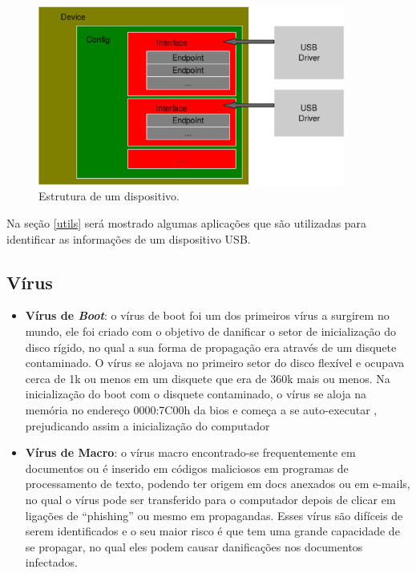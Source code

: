 \begin{figure}[H]
  \centering
  \caption{Estrutura de um dispositivo.}
  \label{fig:usbdevice}
  \includegraphics[width=0.9\textwidth]{figure/usbdevice.eps}
\end{figure}

Na seção \ref{utils} será mostrado algumas aplicações que são utilizadas para identificar
as informações de um dispositivo USB.

\subsection{Vírus}

\begin{itemize}
  \item \textbf{Vírus de \textit{Boot}}: o vírus de boot foi um dos primeiros vírus a surgirem no mundo,
    ele foi criado com o objetivo de danificar o setor de inicialização do disco rígido,
    no qual a sua forma de propagação era através de um disquete contaminado. O vírus se
    alojava no primeiro setor do disco flexível e ocupava cerca de 1k ou menos em um
    disquete que era de 360k mais ou menos. Na inicialização do boot com o disquete
    contaminado, o vírus se aloja na memória no endereço 0000:7C00h da bios e começa
    a se auto-executar , prejudicando assim a inicialização do computador

  \item \textbf{Vírus de Macro}: o vírus macro encontrado-se frequentemente em documentos ou é
    inserido em códigos maliciosos em programas de processamento de texto, podendo ter
    origem em docs anexados ou em e-mails, no qual o vírus pode ser transferido para o
    computador depois de clicar em ligações de “phishing” ou mesmo em propagandas. Esses
    vírus são difíceis de serem identificados e o seu maior risco é que tem uma grande
    capacidade de se propagar, no qual eles podem causar danificações nos documentos infectados.
\end{itemize}

